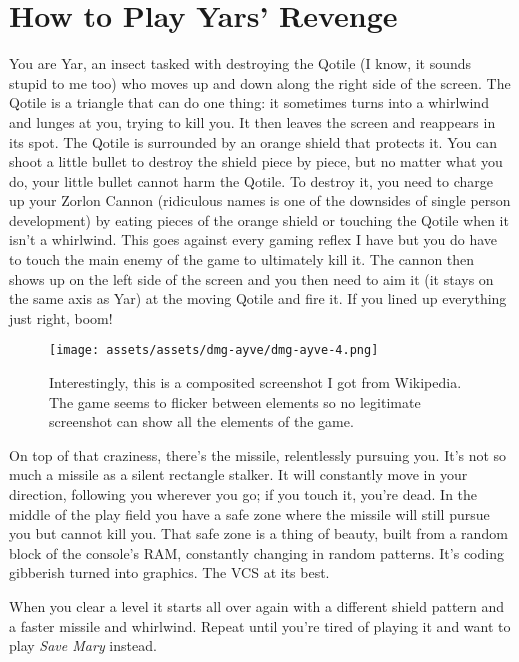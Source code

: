 \documentclass{book}
\begin{document}
\FloatBarrier\needspace{10mm}\section*{How to Play Yars’ Revenge}\nopagebreak[4]

You are Yar, an insect tasked with destroying the Qotile (I know, it sounds stupid to me too) who moves up and down along the right side of the screen. The Qotile is a triangle that can do one thing: it sometimes turns into a whirlwind and lunges at you, trying to kill you. It then leaves the screen and reappears in its spot. The Qotile is surrounded by an orange shield that protects it. You can shoot a little bullet to destroy the shield piece by piece, but no matter what you do, your little bullet cannot harm the Qotile. To destroy it, you need to charge up your Zorlon Cannon (ridiculous names is one of the downsides of single person development) by eating pieces of the orange shield or touching the Qotile when it isn’t a whirlwind. This goes against every gaming reflex I have but you do have to touch the main enemy of the game to ultimately kill it. The cannon then shows up on the left side of the screen and you then need to aim it (it stays on the same axis as Yar) at the moving Qotile and fire it. If you lined up everything just right, boom!

\begin{figure}[hbt]
\vskip 10pt
\centering \texttt{[image: assets/assets/dmg-ayve/dmg-ayve-4.png]}\par\pagetwodescription Interestingly, this is a composited screenshot I got from Wikipedia. The game seems to flicker between elements so no legitimate screenshot can show all the elements of the game.
\vskip 6pt
\end{figure}

On top of that craziness, there’s the missile, relentlessly pursuing you. It’s not so much a missile as a silent rectangle stalker. It will constantly move in your direction, following you wherever you go; if you touch it, you’re dead. In the middle of the play field you have a safe zone where the missile will still pursue you but cannot kill you. That safe zone is a thing of beauty, built from a random block of the console’s RAM, constantly changing in random patterns. It’s coding gibberish turned into graphics. The VCS at its best.

When you clear a level it starts all over again with a different shield pattern and a faster missile and whirlwind. Repeat until you’re tired of playing it and want to play \emph{Save Mary} instead.
\end{document}
